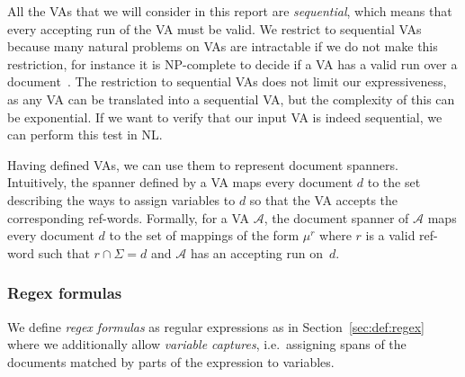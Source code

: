 \documentclass[12px]{article}
\theoremstyle{definition}
\begin{document}

        All the VAs that we will consider in this report are
        \textit{sequential}, which means that every accepting run of the VA
        must be valid. We restrict to sequential VAs because many natural
        problems on VAs are intractable if we do not make this restriction, for
        instance it is NP-complete to decide if a VA has a valid run over a
        document~\cite{freydenberger:LIPIcs:2017}. The restriction to
        sequential VAs does not limit our expressiveness, as any VA can be
        translated into a sequential VA, but the complexity of this can be
        exponential\cite{maturana2018document}. If we want to verify that our
        input VA is indeed sequential, we can perform this test in
        NL\cite{maturana2018document}.

        Having defined VAs, we can use them to represent document spanners.
        Intuitively, the spanner defined by a VA maps every document $d$ to the
        set describing the ways to assign variables to $d$ so that the VA
        accepts the corresponding ref-words. Formally, for a VA $\mathcal{A}$,
        the document spanner of $\mathcal{A}$ maps every document $d$ to the
        set of mappings of the form $\mu^r$ where $r$ is a valid ref-word such
        that $r \cap \Sigma = d$ and $\mathcal{A}$ has an accepting run on~$d$.


      \subsubsection{Regex formulas}%
        \label{sec:regex_formula}

        We define \emph{regex formulas} as regular expressions as in
        Section~\ref{sec:def:regex} where we additionally allow \emph{variable
        captures}, i.e.\ assigning spans of the documents matched by parts of
        the expression to variables.
\end{document}
